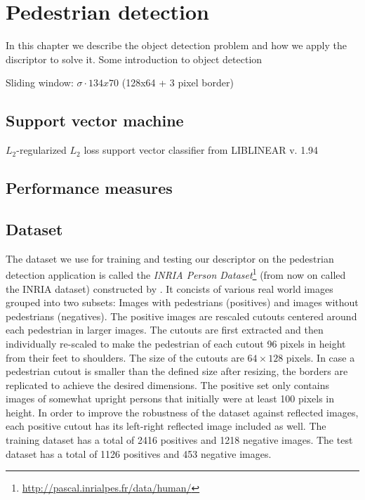 \documentclass[thesis.tex]{subfiles}
\begin{document}
\chapter{Pedestrian detection}
\label{sec:od}
In this chapter we describe the object detection problem and how we apply the discriptor to solve it.
Some introduction to object detection

Sliding window: $\sigma \cdot 134x70$ (128x64 + 3 pixel border)

\section{Support vector machine}

$L_2$-regularized $L_2$ loss support vector classifier from LIBLINEAR v. 1.94 \cite{fan2008liblinear}


\section{Performance measures}

\section{Dataset}
\label{sec:odDataset}

The dataset we use for training and testing our descriptor on the pedestrian detection application is called the \emph{INRIA Person Dataset}\footnote{\url{http://pascal.inrialpes.fr/data/human/}} (from now on called the INRIA dataset) constructed by \citet{dalal2005histograms}.
It concists of various real world images grouped into two subsets: Images with pedestrians (positives) and images without pedestrians (negatives). The positive images are rescaled cutouts centered around each pedestrian in larger images. The cutouts are first extracted and then individually re-scaled to make the pedestrian of each cutout 96 pixels in height from their feet to shoulders. The size of the cutouts are $64 \times 128$ pixels. In case a pedestrian cutout is smaller than the defined size after resizing, the borders are replicated to achieve the desired dimensions.
The positive set only contains images of somewhat upright persons that initially were at least 100 pixels in height. In order to improve the robustness of the dataset against reflected images, each positive cutout has its left-right reflected image included as well.
The training dataset has a total of 2416 positives and 1218 negative images.
The test dataset has a total of 1126 positives and 453 negative images.
\end{document}
